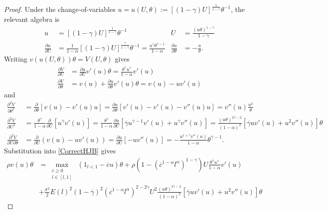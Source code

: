 \documentclass[11pt]{article}
\theoremstyle{plain}
\begin{document}
\begin{proof}
Under the change-of-variables $u = u(U,\theta) := [(1-\gamma)U]^{\frac{1}{1-\overline{\gamma}}}\theta^{-1}$, the relevant algebra is
\begin{align*}
u & = [(1-\gamma)U]^{\frac{1}{1-\overline{\gamma}}}\theta^{-1} &
U & = \frac{(u\theta)^{1-\overline{\gamma}}}{1-\gamma} 
\\ \frac{\partial u}{\partial U} & = \frac{1}{1-\alpha}[(1-\gamma)U]^{\frac{\overline{\gamma}}{1-\overline{\gamma}}}\theta^{-1} = \frac{u^{\overline{\gamma}}\theta^{\overline{\gamma}-1}}{1-\alpha}
& \frac{\partial u}{\partial \theta} & = -\frac{u}{\theta}.
\end{align*}
Writing $v(u(U,\theta))\theta = V(U,\theta)$ gives
\begin{align*}
\frac{\partial V}{\partial U} & = \frac{\partial u}{\partial U}v'(u)\theta = \frac{\theta^{\overline{\gamma}} u^{\overline{\gamma}}}{1-\alpha}v'(u)
\\ \frac{\partial V}{\partial \theta} & = v(u) + \frac{\partial u}{\partial \theta}v'(u)\theta = v(u) - uv'(u)
\end{align*}
and 
\begin{align*}
\frac{\partial^2 V}{\partial \theta^2} & = \frac{\partial}{\partial \theta}[v(u) - v'(u) u] = \frac{\partial u}{\partial \theta}[v'(u) - v'(u) - v''(u)u] = v''(u)\frac{u^2}{\theta}
\\ \frac{\partial^2V}{\partial U^2} & = \frac{\theta^{\overline{\gamma}}}{1-\alpha}\frac{\partial}{\partial U}[u^{\overline{\gamma}}v'(u)]
= \frac{\theta^{\overline{\gamma}}}{1-\alpha} \frac{\partial u}{\partial U}[\overline{\gamma} u^{\overline{\gamma}-1}v'(u) + u^{\overline{\gamma}}v''(u)]
= \frac{(u\theta)^{2\overline{\gamma}-2}}{(1-\alpha)^2}[\overline{\gamma} uv'(u) + u^2 v''(u)]\theta
\\  \frac{\partial^2 V}{\partial U \partial \theta} & = \frac{\partial}{\partial U}(v(u) - uv'(u)) = \frac{\partial u}{\partial U}[- uv''(u)] = -\frac{u^{1+\overline{\gamma}}v''(u)}{1-\alpha}\theta^{\overline{\gamma}-1}.
\end{align*} 
Substitution into \eqref{CorrectHJB} gives
\begin{align*}
\rho v(u)\theta & = \max_{\substack{\overline{c} \geq 0 \\ l \in [\underline{l}, 1]}} \ (1_{l<1} - \overline{c}u) \theta + \rho {\left(1 - {\left(\overline{c}^{1-\alpha}l^{\alpha} \right)}^{1-\gamma} \right)}U\frac{\theta^{\overline{\gamma}} u^{\overline{\gamma}}}{1-\alpha}v'(u)
\\ & + \frac{\sigma^2}{2}E(l)^2(1-\overline{\gamma})^2 {\left(\overline{c}^{1-\alpha}l^{\alpha} \right)}^{2-2\gamma}U^2\frac{(u\theta)^{2\overline{\gamma}-2}}{(1-\alpha)^2}[\overline{\gamma} uv'(u) + u^2 v''(u)]\theta

\end{align*}
\end{proof}
\end{document}

